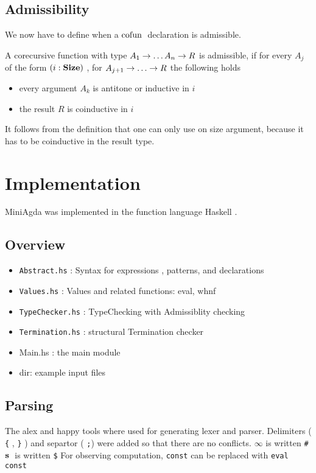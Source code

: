 \section{Admissibility}
We now have to define when a $\mathrm{cofun}\;$ declaration is admissible.
\begin{definition}
A corecursive function with type $ A_1 \rightarrow \dots A_n \rightarrow R $ is admissible, if
for every $A_j$ of the form $(i : \mathbf{Size} )$ , for $A_{j + 1} \ra \dots \ra R $ the following holds 
\begin{itemize}
\item
every argument $A_k$ is antitone or inductive in $i$
\item
the result $R$ is coinductive in $i$  
\end{itemize}
\end{definition}
It follows from the definition that one can only use on size argument, because it has to be coinductive in the result type.
\chapter{Implementation}

MiniAgda was implemented in the function language Haskell \cite{haskell}.

\section{Overview}
\begin{itemize}
\item
\texttt{Abstract.hs} : Syntax for expressions , patterns, and declarations
\item
\texttt{Values.hs} : Values and related functions: eval, whnf 
\item
\texttt{TypeChecker.hs} : TypeChecking with Admissiblity checking
\item
\texttt{Termination.hs} : structural Termination checker
\item
Main.hs : the main module
\item
{} dir: example input files
\end{itemize}

\section{Parsing}
The alex \cite{alex} and happy \cite{happy} tools where used for generating lexer and parser.
Delimiters ( \texttt{\{} , \texttt{\}} ) and separtor ( \texttt{;}) were added so that there are no 
conflicts.
$ \infty $ is written \texttt{\#} 
$ \mathbf{s}\; $ is written \texttt{\$}
For observing computation, \texttt{const} can be replaced with {\texttt {eval const}}

